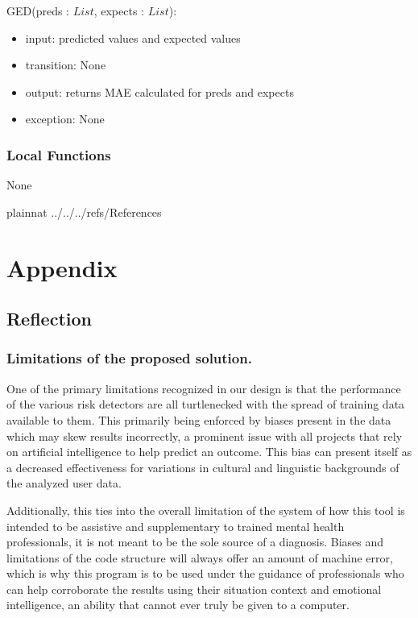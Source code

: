\documentclass[12pt, titlepage]{article}
\begin{document}
\noindent GED(preds : $List$, expects : $List$):
\begin{itemize}
\item input: predicted values and expected values
\item transition: None
\item output: returns MAE calculated for preds and expects
\item exception: None
\end{itemize}

\subsubsection{Local Functions}

None


\newpage

 {plainnat}
 {../../../refs/References}

\newpage    

\section{Appendix} \label{Appendix}
\subsection{Reflection}

\subsubsection{Limitations of the proposed solution.}
One of the primary limitations recognized in our design is that the performance of the various risk detectors are all turtlenecked with the spread of training data available to them. This primarily being enforced by biases present in the data which may skew results incorrectly, a prominent issue with all projects that rely on artificial intelligence to help predict an outcome. This bias can present itself as a decreased effectiveness for variations in cultural and linguistic backgrounds of the analyzed user data.

Additionally, this ties into the overall limitation of the system of how this tool is intended to be assistive and supplementary to trained mental health professionals, it is not meant to be the sole source of a diagnosis. Biases and limitations of the code structure will always offer an amount of machine error, which is why this program is to be used under the guidance of professionals who can help corroborate the results using their situation context and emotional intelligence, an ability that cannot ever truly be given to a computer.  
\end{document}
